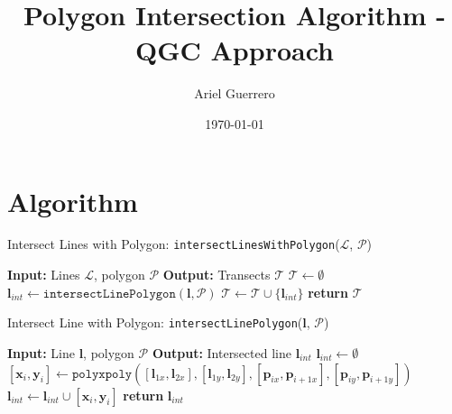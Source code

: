 \documentclass{article}
\begin{document}
\title{Polygon Intersection Algorithm - QGC Approach}
\author{Ariel Guerrero}
\date{\today}
\maketitle

\section*{Algorithm}
\begin{algorithm}
\caption{Intersect Lines with Polygon: \texttt{intersectLinesWithPolygon}($\mathcal{L}$, $\mathcal{P}$)}
\begin{algorithmic}[1]
\State \textbf{Input:} Lines $\mathcal{L}$, polygon $\mathcal{P}$
\State \textbf{Output:} Transects $\mathcal{T}$
\State
\State $\mathcal{T} \gets \emptyset$
    \State $\mathbf{l}_{int} \gets \texttt{intersectLinePolygon}(\mathbf{l}, \mathcal{P})$
        \State $\mathcal{T} \gets \mathcal{T} \cup \{\mathbf{l}_{int}\}$
    \EndIf
\EndFor
\State
\State \textbf{return} $\mathcal{T}$
\end{algorithmic}
\end{algorithm}

\begin{algorithm}
\caption{Intersect Line with Polygon: \texttt{intersectLinePolygon}($\mathbf{l}$, $\mathcal{P}$)}
\begin{algorithmic}[1]
\State \textbf{Input:} Line $\mathbf{l}$, polygon $\mathcal{P}$
\State \textbf{Output:} Intersected line $\mathbf{l}_{int}$
\State
\State $\mathbf{l}_{int} \gets \emptyset$
    \State $[\mathbf{x}_i, \mathbf{y}_i] \gets \texttt{polyxpoly}([\mathbf{l}_{1x}, \mathbf{l}_{2x}], [\mathbf{l}_{1y}, \mathbf{l}_{2y}], [\mathbf{p}_{ix}, \mathbf{p}_{i+1x}], [\mathbf{p}_{iy}, \mathbf{p}_{i+1y}])$
        \State $\mathbf{l}_{int} \gets \mathbf{l}_{int} \cup [\mathbf{x}_i, \mathbf{y}_i]$
    \EndIf
\EndFor
\State
\State \textbf{return} $\mathbf{l}_{int}$
\end{algorithmic}
\end{algorithm}
\end{document}
